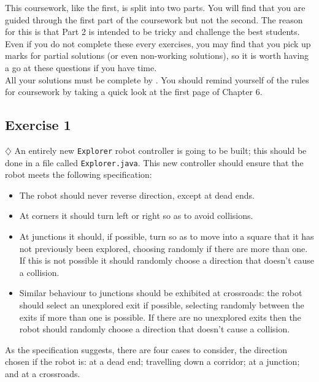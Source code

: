 \noindent
This coursework, like the first, is split into two parts. You will find that
you are guided through the first part of the coursework but not the second.
The reason for this is that Part 2 is intended to be tricky and challenge the best students. 
Even if you do not complete
these every exercises, you may find that you pick up marks for partial 
solutions (or even non-working solutions), so it is worth having a go at these 
questions if you have time.\\

\noindent
All your solutions must
be complete by \deadlinetwo. You should remind
yourself of the rules for coursework by taking a quick look at the first page
of Chapter 6.


\subsection{Exercise 1}

$\diamondsuit$
An entirely new {\tt Explorer} robot controller is going to be built; this
should be done
in a file called {\tt Explorer.java}. This new controller should ensure
that the robot meets the following specification:

\begin{itemize}

\item
The robot should never reverse direction, except at dead ends.

\item
At corners it should turn left or right so as to avoid collisions.

\item
At junctions it should, if possible, turn so as to move into a square that
it has not previously been explored, choosing randomly if there are more than one.
If this is not possible it should randomly choose a direction that doesn't
cause a collision.

\item
Similar behaviour to junctions should be exhibited at crossroads:
the robot should select an unexplored exit if possible, selecting
randomly between the exits if more than one is possible. If there
are no unexplored exits then the robot should randomly choose a
direction that doesn't cause a collision.

\end{itemize}

\noindent As the specification suggests, there are four cases to
consider, the direction chosen if the robot is: at a dead end; travelling down
a corridor; at a junction; and at a crossroads.\\

